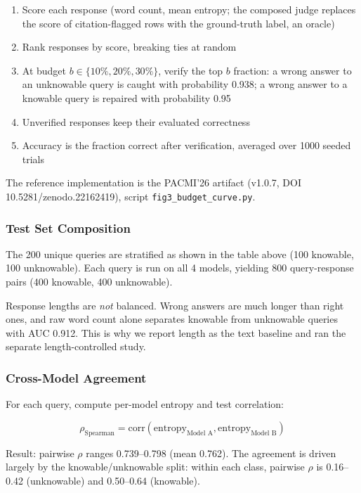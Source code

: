\documentclass[11pt]{article}
\begin{document}
\begin{enumerate}
    \item Score each response (word count, mean entropy; the composed judge replaces the score of citation-flagged rows with the ground-truth label, an oracle)
    \item Rank responses by score, breaking ties at random
    \item At budget $b \in \{10\%, 20\%, 30\%\}$, verify the top $b$ fraction: a wrong answer to an unknowable query is caught with probability 0.938; a wrong answer to a knowable query is repaired with probability 0.95
    \item Unverified responses keep their evaluated correctness
    \item Accuracy is the fraction correct after verification, averaged over 1000 seeded trials
\end{enumerate}
The reference implementation is the PACMI'26 artifact (v1.0.7, DOI 10.5281/zenodo.22162419), script \texttt{fig3\_\allowbreak budget\_\allowbreak curve.py}.

\subsubsection{Test Set Composition}

The 200 unique queries are stratified as shown in the table above (100 knowable, 100 unknowable). Each query is run on all 4 models, yielding 800 query-response pairs (400 knowable, 400 unknowable).

Response lengths are \emph{not} balanced. Wrong answers are much longer than right ones, and raw word count alone separates knowable from unknowable queries with AUC 0.912. This is why we report length as the text baseline and ran the separate length-controlled study.

\subsubsection{Cross-Model Agreement}

For each query, compute per-model entropy and test correlation:

\begin{equation}
\rho_{\text{Spearman}} = \text{corr}(\text{entropy}_{\text{Model A}}, \text{entropy}_{\text{Model B}})
\end{equation}

Result: pairwise $\rho$ ranges 0.739--0.798 (mean 0.762). The agreement is driven largely by the knowable/unknowable split: within each class, pairwise $\rho$ is 0.16--0.42 (unknowable) and 0.50--0.64 (knowable).
\end{document}
